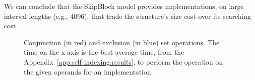 We can conclude that the SkipBlock model provides implementations, on large
interval lengths (e.g., 4096), that trade the structure's size cost over its
searching cost.

\begin{figure}
\centering
{}\quad
{}
\caption{Conjunction (in red) and exclusion (in blue) set operations. The time
on the x axis is the best average time, from the
Appendix~\ref{app:self-indexing:results}, to perform the operation on the
given operands for an implementation.}
\label{fig:conj-excl-res}
\end{figure}
